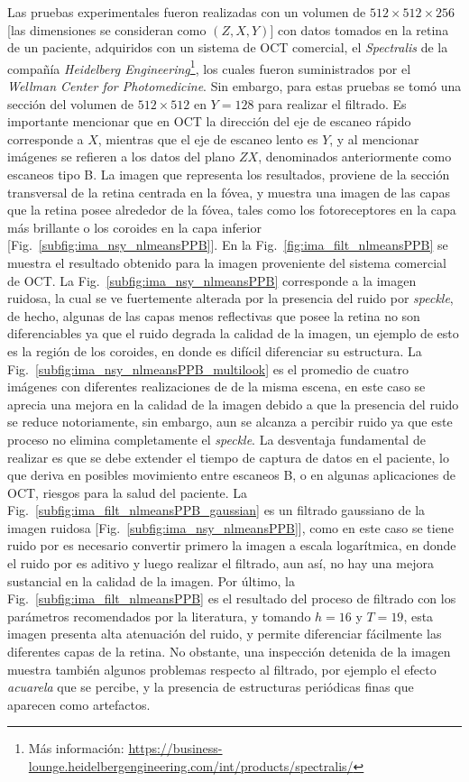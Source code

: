Las pruebas experimentales fueron realizadas con un volumen de $512\times512\times256$ [las dimensiones se consideran como $(Z,X,Y)$] con datos tomados en la retina de un paciente, adquiridos con un sistema de OCT comercial, el \textit{Spectralis} de la compañía \textit{Heidelberg Engineering}\footnote{Más información: \url{https://business-lounge.heidelbergengineering.com/int/products/spectralis/}}, los cuales fueron suministrados por el \textit{Wellman Center for Photomedicine}. Sin embargo, para estas pruebas se tomó una sección del volumen de $512\times512$ en $Y=128$ para realizar el filtrado. Es importante mencionar que en OCT la dirección del eje de escaneo rápido corresponde a $X$, mientras que el eje de escaneo lento es $Y$, y al mencionar imágenes se refieren a los datos del plano $ZX$, denominados anteriormente como escaneos tipo B. La imagen que representa los resultados, proviene de la sección transversal de la retina centrada en la fóvea, y muestra una imagen de las capas que la retina posee alrededor de la fóvea, tales como los fotoreceptores en la capa más brillante o los coroides en la capa inferior [Fig.~\ref{subfig:ima_nsy_nlmeansPPB}]. En la Fig.~\ref{fig:ima_filt_nlmeansPPB} se muestra el resultado obtenido para la imagen proveniente del sistema comercial de OCT. La Fig.~\ref{subfig:ima_nsy_nlmeansPPB} corresponde a la imagen ruidosa, la cual se ve fuertemente alterada por la presencia del ruido por \textit{speckle}, de hecho, algunas de las capas menos reflectivas que posee la retina no son diferenciables ya que el ruido degrada la calidad de la imagen, un ejemplo de esto es la región de los coroides, en donde es difícil diferenciar su estructura. La Fig.~\ref{subfig:ima_nsy_nlmeansPPB_multilook} es el promedio de cuatro imágenes con diferentes realizaciones de \speckle de la misma escena, en este caso se aprecia una mejora en la calidad de la imagen debido a que la presencia del ruido se reduce notoriamente, sin embargo, aun se alcanza a percibir ruido ya que este proceso no elimina completamente el \textit{speckle}. La desventaja fundamental de realizar \multilooking es que se debe extender el tiempo de captura de datos en el paciente, lo que deriva en posibles movimiento entre escaneos B, o en algunas aplicaciones de OCT, riesgos para la salud del paciente. La Fig.~\ref{subfig:ima_filt_nlmeansPPB_gaussian} es un filtrado gaussiano de la imagen ruidosa [Fig.~\ref{subfig:ima_nsy_nlmeansPPB}], como en este caso se tiene ruido por \speckle es necesario convertir primero la imagen a escala logarítmica, en donde el ruido por \speckle es aditivo y luego realizar el filtrado, aun así, no hay una mejora sustancial en la calidad de la imagen. Por último, la Fig.~\ref{subfig:ima_filt_nlmeansPPB} es el resultado del proceso de filtrado con los parámetros recomendados por la literatura, y tomando $h = 16$ y $T = 19$, esta imagen presenta alta atenuación del ruido, y permite diferenciar fácilmente las diferentes capas de la retina. No obstante, una inspección detenida de la imagen muestra también algunos problemas respecto al filtrado, por ejemplo el efecto \textit{acuarela} que se percibe, y la presencia de estructuras periódicas finas que aparecen como artefactos.

